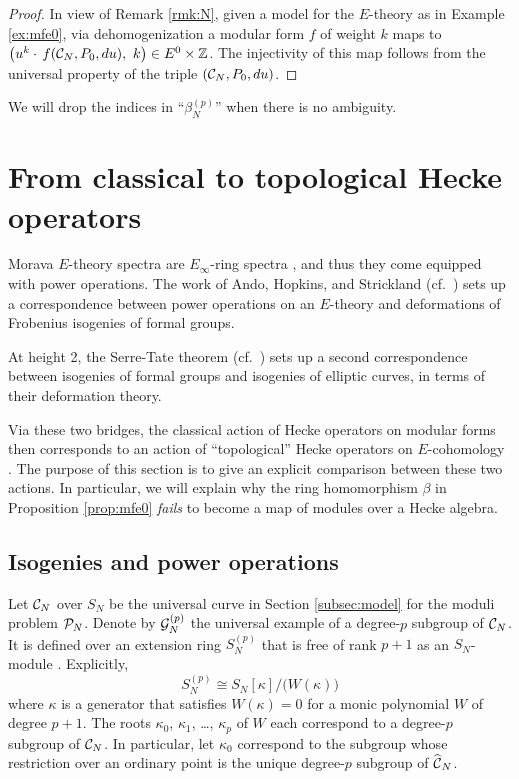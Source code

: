 \documentclass{gtpart}
\theoremstyle{definition}
\theoremstyle{remark}
\newcommand{\mb}[1]{\mathbb{#1}}
\newcommand{\CC}{{\cal C}}
\newcommand{\CG}{{\cal G}}
\newcommand{\CP}{{\cal P}}
\newcommand{\BZ}{{\mb Z}}
\newcommand{\HCC}{\widehat{~\!\!\CC}}
\newcommand{\B}{\beta}
\newcommand{\K}{\kappa}
\renewcommand{\=}{\approx}
\renewcommand{\-}{\sim}
\numberwithin{equation}{section}
\begin{document}
\begin{proof}
 In view of Remark \ref{rmk:N}, given a model for the $E$-theory as in Example 
 \ref{ex:mfe0}, via dehomogenization a modular form $f$ of weight $k$ maps to 
 $\big( u^k \cdot \, f(\CC_N, P_0, du), ~ k \big) \in E^0 \times \BZ$.  The 
 injectivity of this map follows from the universal property of the triple 
 $(\CC_N, P_0, du)$.  
\end{proof}

We will drop the indices in ``$\B_N^{(p)}$'' when there is no ambiguity.  



\section{From classical to topological Hecke operators}
\label{sec:ct}

Morava $E$-theory spectra are $E_\infty$-ring spectra \cite[Corollary 7.6]{GH}, 
and thus they come equipped with power operations.  The work of Ando, Hopkins, 
and Strickland \cite{AHS04} (cf.~\cite[Theorem B]{cong}) sets up a 
correspondence between power operations on an $E$-theory and deformations of 
Frobenius isogenies of formal groups.  

At height 2, the Serre-Tate theorem \cite{LST} (cf.~\cite[Theorem 2.9.1]{KM}) 
sets up a second correspondence between isogenies of formal groups and isogenies 
of elliptic curves, in terms of their deformation theory.  

Via these two bridges, the classical action of Hecke operators on modular forms 
then corresponds to an action of ``topological'' Hecke operators on 
$E$-cohomology \cite[Section 14]{log}.  The purpose of this section is to give 
an explicit comparison between these two actions.  In particular, we will 
explain why the ring homomorphism $\B$ in Proposition \ref{prop:mfe0} 
{\em fails} to become a map of modules over a Hecke algebra.  



\subsection{Isogenies and power operations}
\label{subsec:po}

Let $\CC_N$ over $S_N$ be the universal curve in Section \ref{subsec:model} for 
the moduli problem $\CP_N$.  Denote by $\CG_N^{(p)}$ the universal example of a 
degree-$p$ subgroup of $\CC_N$.  It is defined over an extension ring 
$S_N^{(p)}$ that is free of rank $p + 1$ as an $S_N$-module 
\cite[Theorem 6.6.1]{KM}.  Explicitly, 
\[
 S_N^{(p)} \cong S_N[\K] / \big(W(\K)\big) 
\]
where $\K$ is a generator that satisfies $W(\K) = 0$ for a monic polynomial $W$ 
of degree $p + 1$.  The roots $\K_0$, $\K_1$, \ldots, $\K_p$ of $W$ each 
correspond to a degree-$p$ subgroup of $\CC_N$.  In particular, let $\K_0$ 
correspond to the subgroup whose restriction over an ordinary point is the 
unique degree-$p$ subgroup of $\HCC_N$.  
\end{document}
